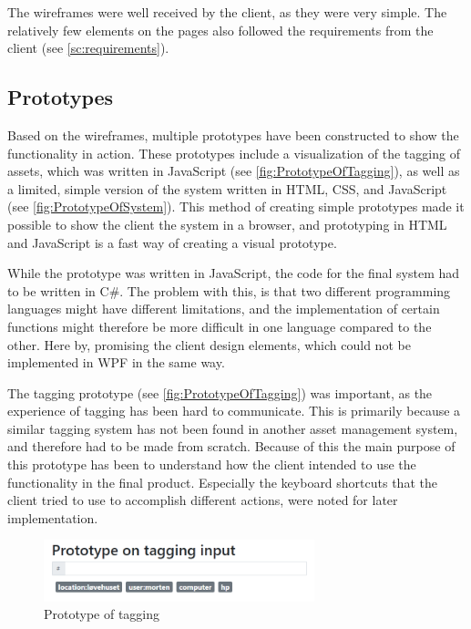 The wireframes were well received by the client, as they were very simple. The relatively few elements on the pages also followed the requirements from the client (see \autoref{sc:requirements}).

\subsection{Prototypes}
Based on the wireframes, multiple prototypes have been constructed to show the functionality in action. These prototypes include a visualization of the tagging of assets, which was written in JavaScript (see \autoref{fig:PrototypeOfTagging}), as well as a limited, simple version of the system written in HTML, CSS, and JavaScript (see \autoref{fig:PrototypeOfSystem}). This method of creating simple prototypes made it possible to show the client the system in a browser, and prototyping in HTML and JavaScript is a fast way of creating a visual prototype.
\par
While the prototype was written in JavaScript, the code for the final system had to be written in C\#. The problem with this, is that two different programming languages might have different limitations, and the implementation of certain functions might therefore be more difficult in one language compared to the other. Here by, promising the client design elements, which could not be implemented in WPF in the same way.
\par
The tagging prototype (see \autoref{fig:PrototypeOfTagging}) was important, as the experience of tagging has been hard to communicate. This is primarily because a similar tagging system has not been found in another asset management system, and therefore had to be made from scratch. Because of this the main purpose of this prototype has been to understand how the client intended to use the functionality in the final product. Especially the keyboard shortcuts that the client tried to use to accomplish different actions, were noted for later implementation.

\begin{figure}[H]
    \centering
    \includegraphics[width=0.7\textwidth]{figures/Prototypes/PrototypeOfTagging.png}
    \caption{Prototype of tagging}
    \label{fig:PrototypeOfTagging}
\end{figure}

